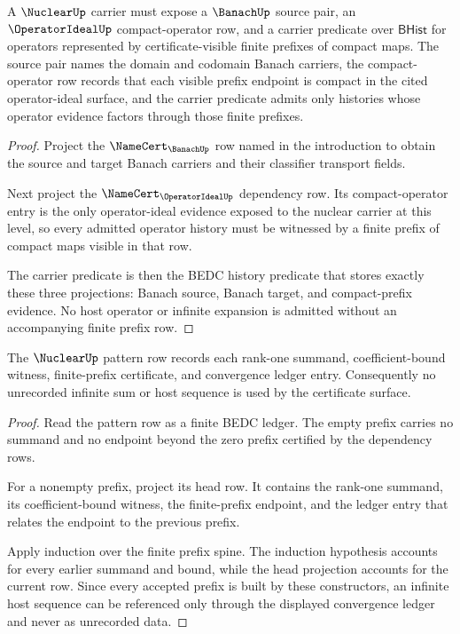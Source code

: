 \begin{theorem}
\label{thm:nuclear-carrier-compact-operator-obligation}
A $\NuclearUp$ carrier must expose a $\BanachUp$ source pair, an $\OperatorIdealUp$ compact-operator row, and a carrier predicate over $\mathsf{BHist}$ for operators represented by certificate-visible finite prefixes of compact maps. The source pair names the domain and codomain Banach carriers, the compact-operator row records that each visible prefix endpoint is compact in the cited operator-ideal surface, and the carrier predicate admits only histories whose operator evidence factors through those finite prefixes.
\end{theorem}

\begin{proof}
Project the $\NameCert_{\BanachUp}$ row named in the introduction to obtain the source and target Banach carriers and their classifier transport fields.

Next project the $\NameCert_{\OperatorIdealUp}$ dependency row. Its compact-operator entry is the only operator-ideal evidence exposed to the nuclear carrier at this level, so every admitted operator history must be witnessed by a finite prefix of compact maps visible in that row.

The carrier predicate is then the BEDC history predicate that stores exactly these three projections: Banach source, Banach target, and compact-prefix evidence. No host operator or infinite expansion is admitted without an accompanying finite prefix row.
\end{proof}

\begin{theorem}
\label{thm:nuclear-rank-one-sum-ledger-obligation}
The $\NuclearUp$ pattern row records each rank-one summand, coefficient-bound witness, finite-prefix certificate, and convergence ledger entry. Consequently no unrecorded infinite sum or host sequence is used by the certificate surface.
\end{theorem}

\begin{proof}
Read the pattern row as a finite BEDC ledger. The empty prefix carries no summand and no endpoint beyond the zero prefix certified by the dependency rows.

For a nonempty prefix, project its head row. It contains the rank-one summand, its coefficient-bound witness, the finite-prefix endpoint, and the ledger entry that relates the endpoint to the previous prefix.

Apply induction over the finite prefix spine. The induction hypothesis accounts for every earlier summand and bound, while the head projection accounts for the current row. Since every accepted prefix is built by these constructors, an infinite host sequence can be referenced only through the displayed convergence ledger and never as unrecorded data.
\end{proof}


